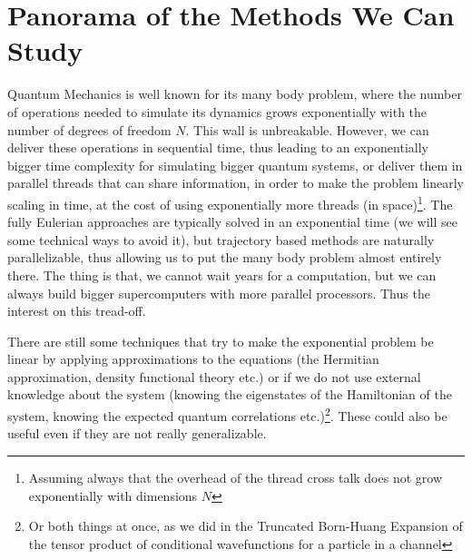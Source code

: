 \documentclass[11pt, a4paper]{article} %
\begin{document}
\section*{Panorama of the Methods We Can Study \vspace{-0.15cm}}
Quantum Mechanics is well known for its many body problem, where the number of operations needed to simulate its dynamics grows exponentially with the number of degrees of freedom $N$. This wall is unbreakable. However, we can deliver these operations in sequential time, thus leading to an exponentially bigger time complexity for simulating bigger quantum systems, or deliver them in parallel threads that can share information, in order to make the problem linearly scaling in time, at the cost of using exponentially more threads (in space)\footnote{Assuming always that the overhead of the thread cross talk does not grow exponentially with dimensions $N$}. The fully Eulerian approaches are typically solved in an exponential time (we will see some technical ways to avoid it), but trajectory based methods are naturally parallelizable, thus allowing us to put the many body problem almost entirely there. The thing is that, we cannot wait years for a computation, but we can always build bigger supercomputers with more parallel processors. Thus the interest on this tread-off.

There are still some techniques that try to make the exponential problem be linear by applying approximations to the equations (the Hermitian approximation, density functional theory etc.) or if we do not use external knowledge about the system (knowing the eigenstates of the Hamiltonian of the system, knowing the expected quantum correlations etc.)\footnote{Or both things at once, as we did in the Truncated Born-Huang Expansion of the tensor product of conditional wavefunctions for a particle in a channel}. These could also be useful even if they are not really generalizable.
\end{document}
